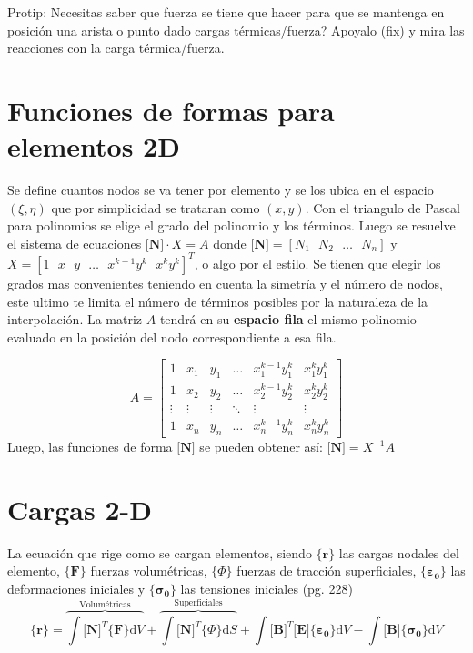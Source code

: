 \documentclass[11pt, a4paper,titlepage]{article}
\newcommand{\ms}{\ \ \ } %
\newcommand{\di}{\textrm{d}}
\newcommand{\sigmab}{\boldsymbol{\sigma}}
\newcommand{\varepsilonb}{\boldsymbol{\varepsilon}}
\newcommand{\CPhi}{\boldsymbol{\{ } \Phi \boldsymbol{\} }}
\newcommand{\Mme}[1]{\boldsymbol{[}\mathbf{#1} \boldsymbol{]}}
\newcommand{\Cme}[1]{\boldsymbol{\{ }\mathbf{#1} \boldsymbol{\}} }
\newcommand{\MB}{\Mme{B}}
\newcommand{\MN}{\Mme{N}}
\newcommand{\ME}{\Mme{E}}
\begin{document}
Protip: Necesitas saber que fuerza se tiene que hacer para que se mantenga en posición una arista o punto dado cargas térmicas/fuerza? Apoyalo (fix) y mira las reacciones con la carga térmica/fuerza.






\section{Funciones de formas para elementos 2D}
Se define cuantos nodos se va tener por elemento y se los ubica en el espacio $(\xi,\eta)$ que por simplicidad se trataran como $(x,y)$. Con el triangulo de Pascal para polinomios se elige el grado del polinomio y los términos. Luego se resuelve el sistema de ecuaciones $\MN\cdot X= A$ donde $\MN=[N_1\ms N_2 \ms \ldots\ms N_n]$ y $X=[1\ms x\ms y \ms\ldots\ms x^{k-1}y^{k} \ms x^{k}y^{k}]^T$, o algo por el estilo. Se tienen que elegir los grados mas convenientes teniendo en cuenta la simetría y el número de nodos, este ultimo te limita el número de términos posibles por la naturaleza de la interpolación. La matriz $A$ tendrá en su \textbf{espacio fila} el mismo polinomio evaluado en la posición del nodo correspondiente a esa fila.

\[
A=
\begin{bmatrix}
    1 & x_1 & y_1 & \dots  & x_{1}^{k-1}y_1^{k} & x_{1}^{k}y_1^{k} \\
    1 & x_2 & y_2 & \dots  & x_{2}^{k-1}y_2^{k} & x_{2}^{k}y_2^{k} \\
    \vdots & \vdots & \vdots & \ddots & \vdots& \vdots \\
    1 & x_n & y_n & \dots  & x_{n}^{k-1}y_n^{k} & x_{n}^{k}y_n^{k}
\end{bmatrix}
\]
Luego, las funciones de forma $\MN$ se pueden obtener así: $\MN=X^{-1} A$

\section*{Cargas 2-D}
La ecuación que rige como se cargan elementos, siendo $\Cme{r}$ las cargas nodales del elemento, $\Cme{F}$ fuerzas volumétricas, $\CPhi$ fuerzas de tracción superficiales, $\Cme{\varepsilonb_0}$ las deformaciones iniciales y $\Cme{\sigmab_0}$ las tensiones iniciales (pg. 228)
\begin{equation} \label{eq:CargasGenerales}
\Cme{r}=\overbrace{\int \MN^T \Cme{F} \di V}^{\text{Volumétricas}} + \overbrace{\int \MN^T \CPhi \di S}^{\text{Superficiales}}+\int \MB^T \ME \Cme{\varepsilonb_0} \di V- \int \MB \Cme{\sigmab_0} \di V
\end{equation}
\end{document}
